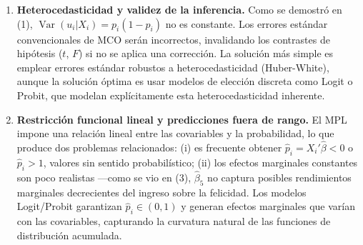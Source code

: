 \documentclass[12pt]{article}
\begin{document}
\begin{enumerate}
\item \textbf{Heterocedasticidad y validez de la inferencia.} Como se demostró en (1), \(\operatorname{Var}(u_i|X_i)=p_i(1-p_i)\) no es constante. Los errores estándar convencionales de MCO serán incorrectos, invalidando los contrastes de hipótesis (\(t\), \(F\)) si no se aplica una corrección. La solución más simple es emplear errores estándar robustos a heterocedasticidad (Huber-White), aunque la solución óptima es usar modelos de elección discreta como Logit o Probit, que modelan explícitamente esta heterocedasticidad inherente.

\item \textbf{Restricción funcional lineal y predicciones fuera de rango.} El MPL impone una relación lineal entre las covariables y la probabilidad, lo que produce dos problemas relacionados: (i) es frecuente obtener \(\hat p_i = X_i'\hat\beta < 0\) o \(\hat p_i > 1\), valores sin sentido probabilístico; (ii) los efectos marginales constantes son poco realistas —como se vio en (3), \(\hat\beta_5\) no captura posibles rendimientos marginales decrecientes del ingreso sobre la felicidad. Los modelos Logit/Probit garantizan \(\hat p_i \in (0,1)\) y generan efectos marginales que varían con las covariables, capturando la curvatura natural de las funciones de distribución acumulada.
\end{enumerate}
\end{document}
